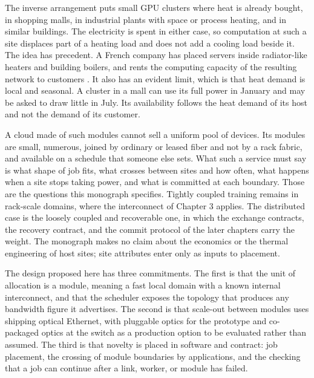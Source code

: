 \documentclass[11pt,openany]{book}
\theoremstyle{remark}
\begin{document}
The inverse arrangement puts small GPU clusters where heat is already bought, in shopping malls, in industrial plants with space or process heating, and in similar buildings. The electricity is spent in either case, so computation at such a site displaces part of a heating load and does not add a cooling load beside it. The idea has precedent. A French company has placed servers inside radiator-like heaters and building boilers, and rents the computing capacity of the resulting network to customers \cite{qarnot,dcd-qarnot}. It also has an evident limit, which is that heat demand is local and seasonal. A cluster in a mall can use its full power in January and may be asked to draw little in July. Its availability follows the heat demand of its host and not the demand of its customer.

A cloud made of such modules cannot sell a uniform pool of devices. Its modules are small, numerous, joined by ordinary or leased fiber and not by a rack fabric, and available on a schedule that someone else sets. What such a service must say is what shape of job fits, what crosses between sites and how often, what happens when a site stops taking power, and what is committed at each boundary. Those are the questions this monograph specifies. Tightly coupled training remains in rack-scale domains, where the interconnect of Chapter 3 applies. The distributed case is the loosely coupled and recoverable one, in which the exchange contracts, the recovery contract, and the commit protocol of the later chapters carry the weight. The monograph makes no claim about the economics or the thermal engineering of host sites; site attributes enter only as inputs to placement.

The design proposed here has three commitments. The first is that the unit of allocation is a module, meaning a fast local domain with a known internal interconnect, and that the scheduler exposes the topology that produces any bandwidth figure it advertises. The second is that scale-out between modules uses shipping optical Ethernet, with pluggable optics for the prototype and co-packaged optics at the switch as a production option to be evaluated rather than assumed. The third is that novelty is placed in software and contract: job placement, the crossing of module boundaries by applications, and the checking that a job can continue after a link, worker, or module has failed.
\end{document}
